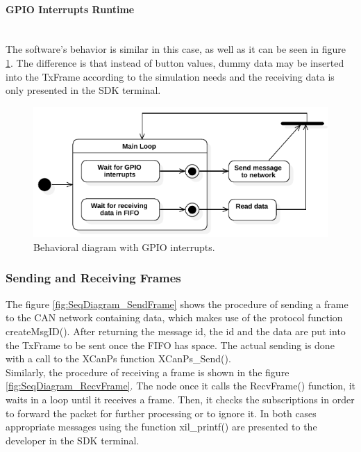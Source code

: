 \paragraph{GPIO Interrupts Runtime}~\\
The software's behavior is similar in this case, as well as it can be seen in figure \ref{fig:StateDiagram_CANSoft_GPIOIntr}.
The difference is that instead of button values, dummy data may be inserted into the TxFrame according to the simulation needs and the receiving data is only presented in the SDK terminal.
\begin{figure}[h!]
	\centering
	\includegraphics[width = 0.85\linewidth]{graphics/StateDiagram_CANSoft_GPIOIntr.pdf}
	\caption{Behavioral diagram with GPIO interrupts.}
	\label{fig:StateDiagram_CANSoft_GPIOIntr}
\end{figure}

\subsubsection{Sending and Receiving Frames}
The figure \ref{fig:SeqDiagram_SendFrame} shows the procedure of sending a frame to the CAN network containing data, which makes use of the protocol function createMsgID().
After returning the message id, the id and the data are put into the TxFrame to be sent once the FIFO has space.
The actual sending is done with a call to the XCanPs function XCanPs\_Send().
\\
Similarly, the procedure of receiving a frame is shown in the figure \ref{fig:SeqDiagram_RecvFrame}.
The node once it calls the RecvFrame() function, it waits in a loop until it receives a frame.
Then, it checks the subscriptions in order to forward the packet for further processing or to ignore it.
In both cases appropriate messages using the function xil\_printf() are presented to the developer in the SDK terminal.

